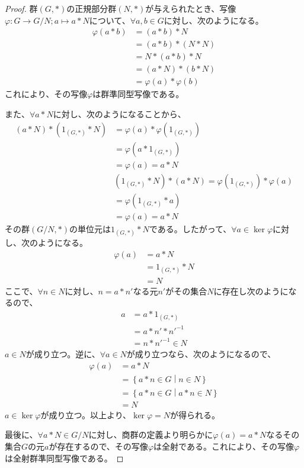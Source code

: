 \documentclass[dvipdfmx]{jsarticle}
\begin{document}
\begin{proof}
群$(G,*)$の正規部分群$(N,*)$が与えられたとき、写像$\varphi:G \rightarrow G/N;a \mapsto a*N$について、$\forall a,b \in G$に対し、次のようになる。
\begin{align*}
\varphi(a*b) &= (a*b)*N\\
&= (a*b)*(N*N)\\
&= N*(a*b)*N\\
&= (a*N)*(b*N)\\
&= \varphi(a)*\varphi(b)
\end{align*}
これにより、その写像$\varphi$は群準同型写像である。\par
また、$\forall a*N$に対し、次のようになることから、
\begin{align*}
(a*N)*\left( 1_{(G,*)}*N \right) &= \varphi(a)*\varphi\left( 1_{(G,*)} \right)\\
&= \varphi\left( a*1_{(G,*)} \right)\\
&= \varphi(a) = a*N\\
&\left( 1_{(G,*)}*N \right)*(a*N) = \varphi\left( 1_{(G,*)} \right)*\varphi(a)\\
&= \varphi\left( 1_{(G,*)}*a \right)\\
&= \varphi(a) = a*N
\end{align*}
その群$(G/N,*)$の単位元は$1_{(G,*)}*N$である。したがって、$\forall a \in \ker\varphi$に対し、次のようになる。
\begin{align*}
\varphi(a) &= a*N\\
&= 1_{(G,*)}*N\\
&= N
\end{align*}
ここで、$\forall n \in N$に対し、$n = a*n'$なる元$n'$がその集合$N$に存在し次のようになるので、
\begin{align*}
a &= a*1_{(G,*)}\\
&= a*n'*{n'}^{- 1}\\
&= n*{n'}^{- 1} \in N
\end{align*}
$a \in N$が成り立つ。逆に、$\forall a \in N$が成り立つなら、次のようになるので、
\begin{align*}
\varphi(a) &= a*N\\
&= \left\{ a*n \in G \middle| n \in N \right\}\\
&= \left\{ a*n \in G \middle| a*n \in N \right\}\\
&= N
\end{align*}
$a \in \ker\varphi$が成り立つ。以上より、$\ker\varphi = N$が得られる。\par
最後に、$\forall a*N \in {G}/{N}$に対し、商群の定義より明らかに$\varphi(a) = a*N$なるその集合$G$の元$a$が存在するので、その写像$\varphi$は全射である。これにより、その写像$\varphi$は全射群準同型写像である。
\end{proof}
\end{document}
